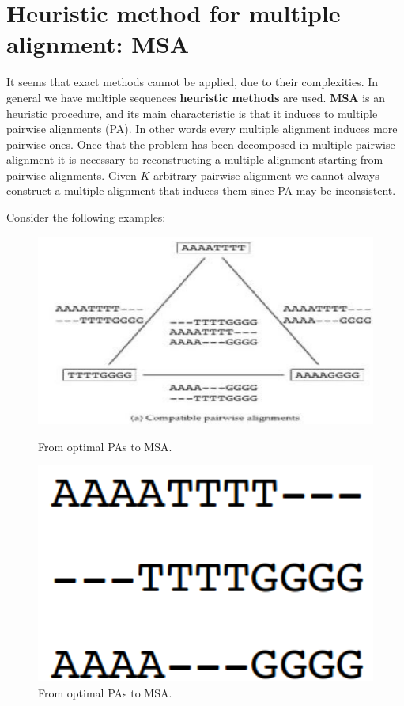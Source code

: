 \section{Heuristic method for multiple alignment: MSA}
It seems that exact methods cannot be applied, due to their complexities. In general we have multiple sequences \textbf{heuristic methods} are used.
\textbf{MSA} is an heuristic procedure, and its main characteristic is that it induces to multiple pairwise alignments (PA). In other words every multiple alignment induces more pairwise ones.
Once that the problem has been decomposed in multiple pairwise alignment it is necessary to reconstructing a multiple alignment starting from pairwise alignments. Given $K$ arbitrary pairwise alignment we cannot always construct a multiple alignment that induces them since PA may be inconsistent.

Consider the following examples:

\begin{figure}[h]
	\begin{minipage}[t]{0.5\linewidth}
		\centering
		\includegraphics[width=1\textwidth]{img/simsa1.png}
		\caption{From optimal PAs to MSA.}
		\label{ex1PA}
	\end{minipage}
	\hspace{0.1cm}
	\begin{minipage}[t]{0.5\linewidth} 
		\centering
		\includegraphics[width=1\textwidth]{img/simsa2.png}
		\caption{From optimal PAs to MSA.}
		\label{ex2PA}
	\end{minipage}        
\end{figure} 
 
